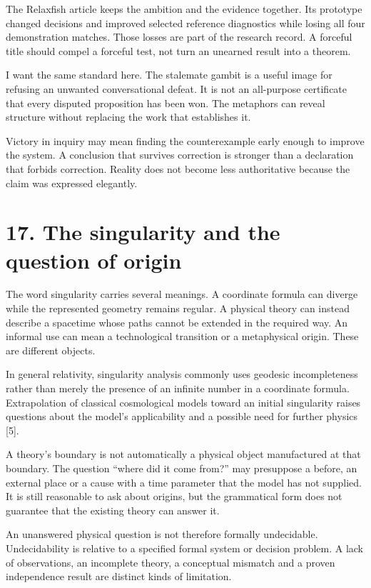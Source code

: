 \documentclass[10pt]{article}
\begin{document}
The Relaxfish article keeps the ambition and the evidence together. Its prototype changed decisions and improved selected reference diagnostics while losing all four demonstration matches. Those losses are part of the research record. A forceful title should compel a forceful test, not turn an unearned result into a theorem.

I want the same standard here. The stalemate gambit is a useful image for refusing an unwanted conversational defeat. It is not an all-purpose certificate that every disputed proposition has been won. The metaphors can reveal structure without replacing the work that establishes it.

Victory in inquiry may mean finding the counterexample early enough to improve the system. A conclusion that survives correction is stronger than a declaration that forbids correction. Reality does not become less authoritative because the claim was expressed elegantly.

\clearpage
\section*{17. The singularity and the question of origin}
The word singularity carries several meanings. A coordinate formula can diverge while the represented geometry remains regular. A physical theory can instead describe a spacetime whose paths cannot be extended in the required way. An informal use can mean a technological transition or a metaphysical origin. These are different objects.

In general relativity, singularity analysis commonly uses geodesic incompleteness rather than merely the presence of an infinite number in a coordinate formula. Extrapolation of classical cosmological models toward an initial singularity raises questions about the model's applicability and a possible need for further physics [5].

A theory's boundary is not automatically a physical object manufactured at that boundary. The question ``where did it come from?'' may presuppose a before, an external place or a cause with a time parameter that the model has not supplied. It is still reasonable to ask about origins, but the grammatical form does not guarantee that the existing theory can answer it.

An unanswered physical question is not therefore formally undecidable. Undecidability is relative to a specified formal system or decision problem. A lack of observations, an incomplete theory, a conceptual mismatch and a proven independence result are distinct kinds of limitation.
\end{document}
